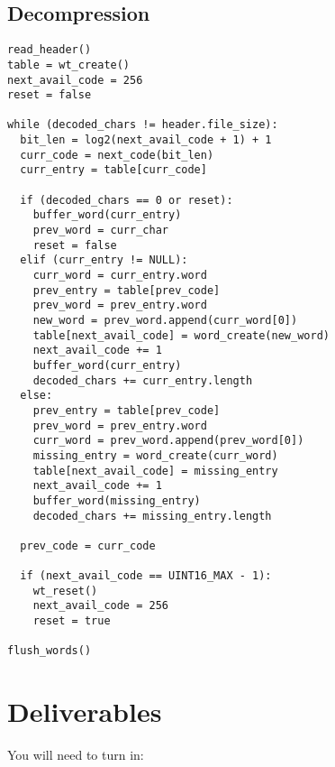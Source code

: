 \documentclass{article}
\begin{document}
\subsection{Decompression}
\begin{lstlisting}
read_header()
table = wt_create()
next_avail_code = 256
reset = false

while (decoded_chars != header.file_size):
  bit_len = log2(next_avail_code + 1) + 1
  curr_code = next_code(bit_len)
  curr_entry = table[curr_code]

  if (decoded_chars == 0 or reset):
    buffer_word(curr_entry)
    prev_word = curr_char
    reset = false
  elif (curr_entry != NULL):
    curr_word = curr_entry.word
    prev_entry = table[prev_code]
    prev_word = prev_entry.word
    new_word = prev_word.append(curr_word[0])
    table[next_avail_code] = word_create(new_word)
    next_avail_code += 1
    buffer_word(curr_entry)
    decoded_chars += curr_entry.length
  else:
    prev_entry = table[prev_code]
    prev_word = prev_entry.word
    curr_word = prev_word.append(prev_word[0])
    missing_entry = word_create(curr_word)
    table[next_avail_code] = missing_entry
    next_avail_code += 1
    buffer_word(missing_entry)
    decoded_chars += missing_entry.length

  prev_code = curr_code

  if (next_avail_code == UINT16_MAX - 1):
    wt_reset()
    next_avail_code = 256
    reset = true

flush_words()

\end{lstlisting}


\section{Deliverables}
You will need to turn in:
\end{document}
